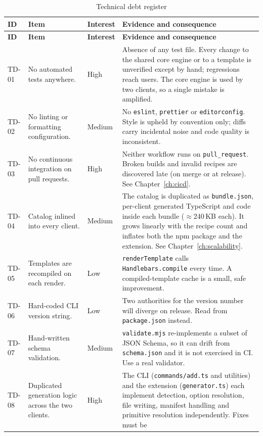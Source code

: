 \begin{longtable}{@{}L{1.2cm}L{3.6cm}L{1.7cm}L{7.1cm}@{}}
\caption{Technical debt register}\\
\toprule
\textbf{ID} & \textbf{Item} & \textbf{Interest} & \textbf{Evidence and consequence} \\
\midrule
\endfirsthead
\toprule
\textbf{ID} & \textbf{Item} & \textbf{Interest} & \textbf{Evidence and consequence} \\
\midrule
\endhead
TD-01 & No automated tests anywhere. & High & Absence of any test file. Every
change to the shared core engine or to a template is unverified except by hand;
regressions reach users. The core engine is used by two clients, so a single
mistake is amplified. \\
TD-02 & No linting or formatting configuration. & Medium & No \texttt{eslint},
\texttt{prettier} or \texttt{editorconfig}. Style is upheld by convention only;
diffs carry incidental noise and code quality is inconsistent. \\
TD-03 & No continuous integration on pull requests. & High & Neither workflow runs
on \texttt{pull\_request}. Broken builds and invalid recipes are discovered late
(on merge or at release). See Chapter~\ref{ch:cicd}. \\
TD-04 & Catalog inlined into every client. & Medium & The catalog is duplicated as
\texttt{bundle.json}, per-client generated TypeScript and code inside each bundle
($\approx$240\,KB each). It grows linearly with the recipe count and inflates
both the npm package and the extension. See Chapter~\ref{ch:scalability}. \\
TD-05 & Templates are recompiled on each render. & Low & \texttt{renderTemplate}
calls \texttt{Handlebars.compile} every time. A compiled-template cache is a
small, safe improvement. \\
TD-06 & Hard-coded CLI version string. & Low & Two authorities for the version
number will diverge on release. Read from \texttt{package.json} instead. \\
TD-07 & Hand-written schema validation. & Medium & \texttt{validate.mjs}
re-implements a subset of JSON Schema, so it can drift from
\texttt{schema.json} and it is not exercised in CI. Use a real validator. \\
TD-08 & Duplicated generation logic across the two clients. & High & The CLI
(\texttt{commands/add.ts} and utilities) and the extension
(\texttt{generator.ts}) each implement detection, option resolution, file
writing, manifest handling and primitive resolution independently. Fixes must be

\end{longtable}
